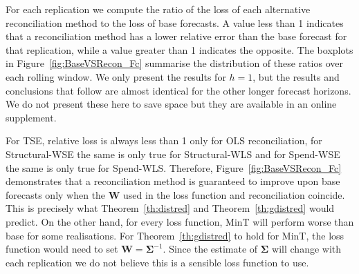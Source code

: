 \documentclass[12pt]{article}
\theoremstyle{definition}
\begin{document}
{\color{blue} For each replication we compute the ratio of the loss of each alternative reconciliation method to the loss of base forecasts. A value less than 1 indicates that a reconciliation method has a lower relative error than the base forecast for that replication, while a value greater than 1 indicates the opposite. The boxplots in Figure~\ref{fig:BaseVSRecon_Fc} summarise the distribution of these ratios over each rolling window. We only present the results for $h=1$, but the results and conclusions that follow are almost identical for the other longer forecast horizons. We do not present these here to save space but they are available {\color{red} in an online supplement.}

For TSE, relative loss is always less than 1 only for OLS reconciliation, for Structural-WSE the same is only true for Structural-WLS and for Spend-WSE the same is only true for Spend-WLS.  Therefore, Figure~\ref{fig:BaseVSRecon_Fc} demonstrates that a reconciliation method is guaranteed to improve upon base forecasts only when the $\bm{W}$ used in the loss function and reconciliation coincide.  This is precisely what Theorem~\ref{th:distred} and Theorem~\ref{th:gdistred} would predict.  On the other hand, for every loss function, MinT will perform worse than base for some realisations.  For Theorem~\ref{th:gdistred} to hold for MinT, the loss function would need to set $\bm{W}=\bm{\Sigma}^{-1}$. Since the estimate of ${\bm\Sigma}$ will change with each replication we do not believe this is a sensible loss function to use.


}

\end{document}
